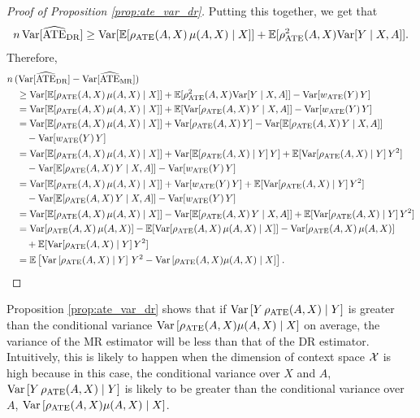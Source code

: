 \begin{proof}[Proof of Proposition \ref{prop:ate_var_dr}]
    Putting this together, we get that
    \begin{align*}
        n\,\textup{Var}[\widehat{\textup{ATE}}_{\textup{DR}}] \geq \textup{Var}[\mathbb{E}[ \rho_{\textup{ATE}}(A, X)\,\mu(A, X)\mid  X]] + \mathbb{E}[\rho^2_{\textup{ATE}}(A, X)\textup{Var}[Y\mid X, A]].
    \end{align*}
    Therefore, 
    \begin{align*}
        &n\,(\textup{Var}[\widehat{\textup{ATE}}_{\textup{DR}}] - \textup{Var}[\widehat{\textup{ATE}}_{\textup{MR}}]) \\
        &\quad\geq \textup{Var}[\mathbb{E}[ \rho_{\textup{ATE}}(A, X)\,\mu(A, X)\mid  X]] + \mathbb{E}[\rho^2_{\textup{ATE}}(A, X)\textup{Var}[Y\mid X, A]] - \textup{Var}[w_{\textup{ATE}}(Y)\,Y]\\
        &\quad= \textup{Var}[\mathbb{E}[ \rho_{\textup{ATE}}(A, X)\,\mu(A, X)\mid  X]] + \mathbb{E}[\textup{Var}[\rho_{\textup{ATE}}(A, X)\,Y\mid X, A]] - \textup{Var}[w_{\textup{ATE}}(Y)\,Y]\\
        &\quad= \textup{Var}[\mathbb{E}[ \rho_{\textup{ATE}}(A, X)\,\mu(A, X)\mid  X]] + \textup{Var}[\rho_{\textup{ATE}}(A, X)\, Y] - \textup{Var}[\mathbb{E}[\rho_{\textup{ATE}}(A, X)\,Y\mid X, A]]\\
        &\qquad- \textup{Var}[w_{\textup{ATE}}(Y)\,Y]\\
        &\quad= \textup{Var}[\mathbb{E}[ \rho_{\textup{ATE}}(A, X)\,\mu(A, X)\mid  X]] + \textup{Var}[\mathbb{E}[\rho_{\textup{ATE}}(A, X)\mid Y]\, Y] + \mathbb{E}[\textup{Var}[\rho_{\textup{ATE}}(A, X)\mid Y]\,Y^2]\\
        &\qquad- \textup{Var}[\mathbb{E}[\rho_{\textup{ATE}}(A, X)\,Y\mid X, A]]- \textup{Var}[w_{\textup{ATE}}(Y)\,Y]\\
        &\quad= \textup{Var}[\mathbb{E}[ \rho_{\textup{ATE}}(A, X)\,\mu(A, X)\mid  X]] + \textup{Var}[w_{\textup{ATE}}(Y)\, Y] + \mathbb{E}[\textup{Var}[\rho_{\textup{ATE}}(A, X)\mid Y]\,Y^2]\\
        &\qquad- \textup{Var}[\mathbb{E}[\rho_{\textup{ATE}}(A, X)\,Y\mid X, A]]- \textup{Var}[w_{\textup{ATE}}(Y)\,Y]\\
        &\quad= \textup{Var}[\mathbb{E}[ \rho_{\textup{ATE}}(A, X)\,\mu(A, X)\mid  X]]- \textup{Var}[\mathbb{E}[\rho_{\textup{ATE}}(A, X)\,Y\mid X, A]] + \mathbb{E}[\textup{Var}[\rho_{\textup{ATE}}(A, X)\mid Y]\,Y^2]\\
        &\quad= \textup{Var}[\rho_{\textup{ATE}}(A, X)\,\mu(A, X)] - \mathbb{E}[\textup{Var}[\rho_{\textup{ATE}}(A, X)\,\mu(A, X)\mid  X]] - \textup{Var}[\rho_{\textup{ATE}}(A, X)\,\mu(A, X)]\\
        &\qquad+ \mathbb{E}[\textup{Var}[\rho_{\textup{ATE}}(A, X)\mid Y]\,Y^2]\\
        &\quad= \mathbb{E} \left[ \textup{Var}\left[ \rho_{\textup{ATE}}(A, X) \mid Y \right]\, Y^2 -  \textup{Var}\left[ \rho_{\textup{ATE}}(A, X)\mu(A, X) \mid X \right] \right].
    \end{align*}
\end{proof}

Proposition \ref{prop:ate_var_dr} shows that if $\textup{Var}\left[Y\, \rho_{\textup{ATE}}(A, X) \mid Y \right]$ is greater than the conditional variance $\textup{Var}\left[ \rho_{\textup{ATE}}(A, X)\mu(A, X) \mid X \right]$ on average, the variance of the MR estimator will be less than that of the DR estimator. Intuitively, this is likely to happen when the dimension of context space $\mathcal{X}$ is high because in this case, the conditional variance over $X$ and $A$, $\textup{Var}\left[Y\, \rho_{\textup{ATE}}(A, X) \mid Y \right]$ is likely to be greater than the conditional variance over $A$, $\textup{Var}\left[ \rho_{\textup{ATE}}(A, X)\mu(A, X) \mid X \right]$.

